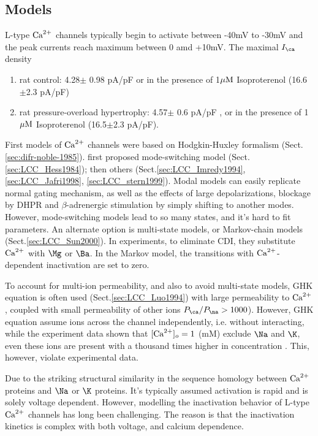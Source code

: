 \subsection{Models}
\label{sec:LCC_models}

L-type ${\text{Ca}^{2+}}$ channels typically begin to activate between -40mV to -30mV and the
peak currents reach maximum between 0 amd +10mV. The maximal $I_\ca$ density
\begin{enumerate}
  \item rat control: 4.28$\pm$ 0.98 pA/pF \citep{delbridge1997} or in the
  presence of 1${\mu\text{M}}$ Isoproterenol (16.6$\pm$2.3 pA/pF)
  \item rat pressure-overload hypertrophy: 4.57$\pm$ 0.6 pA/pF
  \citep{delbridge1997}, or in the presence of 1${\mu\text{M}}$ Isoproterenol
  (16.5$\pm$2.3 pA/pF).
\end{enumerate}

First models of ${\text{Ca}^{2+}}$ channels were based on Hodgkin-Huxley formalism
(Sect.\ref{sec:difr-noble-1985}). \citep{hess1986ccs} first proposed
mode-switching model (Sect.\ref{sec:LCC_Hess1984}); then others
(Sect.\ref{sec:LCC_Imredy1994}, \ref{sec:LCC_Jafri1998}, \ref{sec:LCC_stern1999}).
Modal models can easily replicate normal gating mechanism, as well as the
effects of large depolarizations, blockage by DHPR and $\beta$-adrenergic
stimulation by simply shifting to another modes. However, mode-switching models
lead to so many states, and it's hard to fit parameters. An alternate option is
multi-state models, or Markov-chain models (Sect.\ref{sec:LCC_Sun2000}). 
In experiments, to eliminate CDI, they substitute ${\text{Ca}^{2+}}$ with $\Mg$ or $\Ba$. In
the Markov model, the transitions with ${\text{Ca}^{2+}}$-dependent inactivation are set to
zero.

To account for multi-ion permeability, and also to avoid multi-state models, GHK
equation is often used (Sect.\ref{sec:LCC_Luo1994}) with large permeability to
${\text{Ca}^{2+}}$, coupled with small permeability of other ions $P_\ca/P_\na > 1000$).
However, GHK equation assume ions across the channel independently, i.e. without
interacting, while the experiment data shown that $[{\text{Ca}^{2+}}]_o=1$ (mM) exclude $\Na$
and $\K$, even these ions are present with a thousand times higher in
concentration \citep{mccleskey1986}. This, however, violate experimental data.

Due to the striking structural similarity in the sequence homology between ${\text{Ca}^{2+}}$
proteins and $\Na$ or $\K$ proteins. It's typically assumed activation is rapid
and is solely voltage dependent. However, modelling the inactivation behavior
of L-type ${\text{Ca}^{2+}}$ channels has long been challenging. The reason is that the
inactivation kinetics is complex with both voltage, and calcium dependence.

